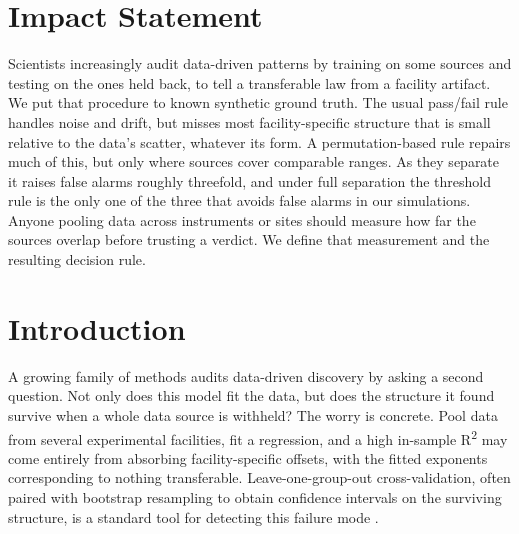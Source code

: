 \documentclass[journal=dce]{CUP-JNL-DTM}%
\begin{document}
\section*{Impact Statement}
\noindent Scientists increasingly audit data-driven patterns by training on some sources and testing on the ones held back, to tell a transferable law from a facility artifact. We put that procedure to known synthetic ground truth. The usual pass/fail rule handles noise and drift, but misses most facility-specific structure that is small relative to the data's scatter, whatever its form. A permutation-based rule repairs much of this, but only where sources cover comparable ranges. As they separate it raises false alarms roughly threefold, and under full separation the threshold rule is the only one of the three that avoids false alarms in our simulations. Anyone pooling data across instruments or sites should measure how far the sources overlap before trusting a verdict. We define that measurement and the resulting decision rule.

\section{Introduction}

A growing family of methods audits data-driven discovery by asking a second question. Not only does this model fit the data, but does the structure it found survive when a whole data source is withheld? The worry is concrete. Pool data from several experimental facilities, fit a regression, and a high in-sample R\textsuperscript{2} may come entirely from absorbing facility-specific offsets, with the fitted exponents corresponding to nothing transferable. Leave-one-group-out cross-validation, often paired with bootstrap resampling to obtain confidence intervals on the surviving structure, is a standard tool for detecting this failure mode \citep{kohavi1995,efron1979}.
\end{document}
